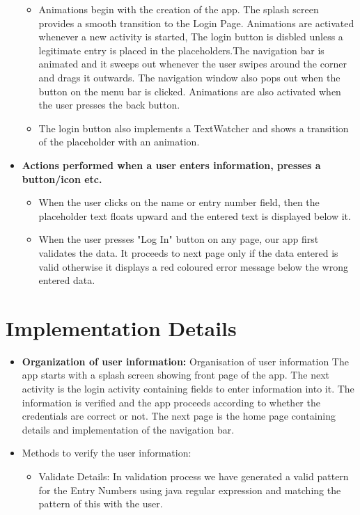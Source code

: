 \documentclass[12pt]{article}
\begin{document}
\begin{itemize}
\begin{itemize}
    \item 
        Animations begin with the creation of the app. The splash screen provides a smooth transition to the Login Page. Animations are activated whenever a new activity is started, The login button is disbled unless a legitimate entry is placed in the placeholders.The navigation bar is animated and it sweeps  out whenever the user swipes around the corner and drags it outwards. The navigation window also pops out when the button on the menu bar is clicked. Animations are also activated when the user presses the back button.
    \item 
       The login button also implements a TextWatcher and shows a transition of the placeholder with an animation.
    \end{itemize}
\item \textbf{\large Actions performed when a user enters information, presses a button/icon etc.}
    \begin{itemize}
    
    \item 
        When the user clicks on the name or entry number field, then the placeholder text floats upward and the entered text is displayed below it.
    \item 
        When the user presses "Log In" button on any page, our app first validates the data. It proceeds to next page only if the data entered is valid otherwise it displays a red coloured error message below the wrong entered data.
    \end{itemize}
    
\end{itemize}

\section{Implementation Details}

\begin{itemize}
\item \textbf{Organization of user information:} Organisation of user information
The app starts with a splash screen showing front page of the app. The next activity is the login activity containing fields to enter information into it. The information is verified and the app proceeds according to whether the credentials are correct or not. The next page is the home page containing details and implementation of the navigation bar. 

    
\item Methods to verify the user information:
	\begin{itemize}
		\item 
		Validate Details: In validation process we have generated a valid pattern for the Entry Numbers using java regular expression and matching the pattern of this with the user.
	\end{itemize}
\end{itemize}
\end{document}
